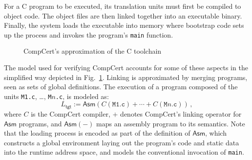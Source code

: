 \documentclass[sigplan,10pt,review,anonymous]{acmart}
\newcommand{\kw}[1]{\ensuremath{ \mathsf{#1} }}
\begin{document}
For a C program to be executed,
its translation units must first be compiled to object code.
The object files are then linked together
into an executable binary.
Finally, the system loads the executable into memory
where bootstrap code sets up the process
and invokes the program's \texttt{main} function.

\begin{figure} %
    \caption{CompCert's approximation of the C toolchain}
    \label{fig:process}
\end{figure}

The model used for verifying CompCert accounts for
some of these aspects in the simplified way
depicted in Fig.~\ref{fig:process}.
Linking is approximated by
merging programs, seen as sets of global definitions.
The execution
of a program composed of the units
\texttt{M1.c}, \ldots, \texttt{M$n$.c},
is modeled as:
\[
    L_\kw{tgt} :=
    \kw{Asm}(C(\texttt{M1.c}) +
             \cdots +
             C(\texttt{M$n$.c})) \,,
\]
where $C$ is the CompCert compiler,
$+$ denotes CompCert's linking operator for \kw{Asm} programs, and
$\kw{Asm}(-)$ maps an assembly program to its semantics.
Note that the loading process is encoded
as part of the definition of $\kw{Asm}$,
which constructs a global environment
laying out the program's code and static data
into the runtime address space,
and models the conventional invocation of \texttt{main}.
\end{document}
